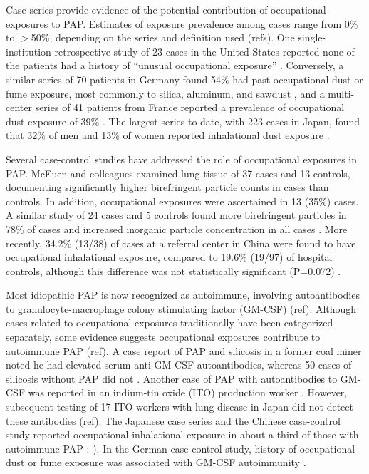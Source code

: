 \documentclass[a4
er,12pt]{article}
\begin{document}
Case series provide evidence of the potential contribution of occupational exposures to PAP.  Estimates of exposure prevalence among cases range from 0\% to \ensuremath{>}50\%, depending on the series and definition used (refs).  One single-institution retrospective study of 23 cases in the United States reported none of the patients had a history of “unusual occupational exposure” \cite{Kariman1984}.  Conversely, a similar series of 70 patients in Germany found 54\% had past occupational dust or fume
exposure, most commonly to silica, aluminum, and sawdust \cite{Bonella2011}, and a multi-center series of 41 patients from France reported a prevalence of occupational dust exposure of 39\% \cite{Briens2002}.  The largest series to date, with 223 cases in Japan, found that 32\% of men and 13\% of women reported inhalational dust exposure \cite{Inoue2008}.  

Several case-control studies have addressed the role of occupational exposures in PAP.  McEuen and colleagues \cite{McEuen1978} examined lung tissue of 37 cases and 13 controls, documenting significantly higher birefringent particle counts in cases than controls.  In addition, occupational exposures were ascertained in 13 (35\%) cases.  A similar study of 24 cases and 5 controls found more birefringent particles in 78\% of cases and increased inorganic particle concentration
in all cases \cite{Abraham1986}.  More recently, 34.2\% (13/38) of cases at a referral center in China were found to have occupational inhalational exposure, compared to 19.6\% (19/97) of hospital controls, although this difference was not statistically significant (P=0.072) \cite{Xiao2015}.   

Most idiopathic PAP is now recognized as autoimmune, involving autoantibodies to granulocyte-macrophage colony stimulating factor (GM-CSF) (ref).  Although cases related to occupational exposures traditionally have been categorized separately, some evidence suggests occupational exposures contribute to autoimmune PAP (ref).  A case report of PAP and silicosis in a former coal miner noted he had elevated serum anti-GM-CSF autoantibodies, whereas 50 cases of silicosis without PAP did
not \cite{Hosokawa2004}.  Another case of PAP with autoantibodies to GM-CSF was reported in an indium-tin oxide (ITO) production worker \cite{Cummings2010}.  However, subsequent testing of 17 ITO workers with lung disease in Japan did not detect these antibodies (ref).  The Japanese case series and the Chinese case-control study reported occupational inhalational exposure in about a third of those with autoimmune PAP \cite{Inoue2008}; \cite{Xiao2015}).  In the German case-control study, history of
occupational dust or fume exposure was associated with GM-CSF autoimmunity \cite{Bonella2011}.  
\end{document}
